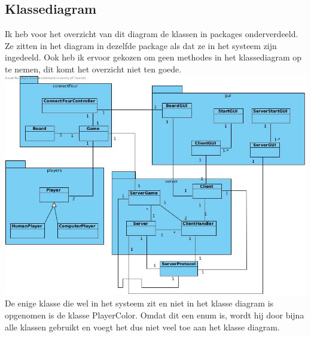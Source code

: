 \documentclass[12pt]{article}
\begin{document}
\subsection{Klassediagram}
Ik heb voor het overzicht van dit diagram de klassen in packages onderverdeeld. Ze zitten in het diagram in dezelfde package als dat ze in het systeem zijn ingedeeld. Ook heb ik ervoor gekozen om geen methodes in het klassediagram op te nemen, dit komt het overzicht niet ten goede. \\
\includegraphics[scale=0.5]{ConnectFour.jpg}\\
De enige klasse die wel in het systeem zit en niet in het klasse diagram is opgenomen is de klasse PlayerColor. Omdat dit een enum is, wordt hij door bijna alle klassen gebruikt en voegt het dus niet veel toe aan het klasse diagram.
\end{document}
